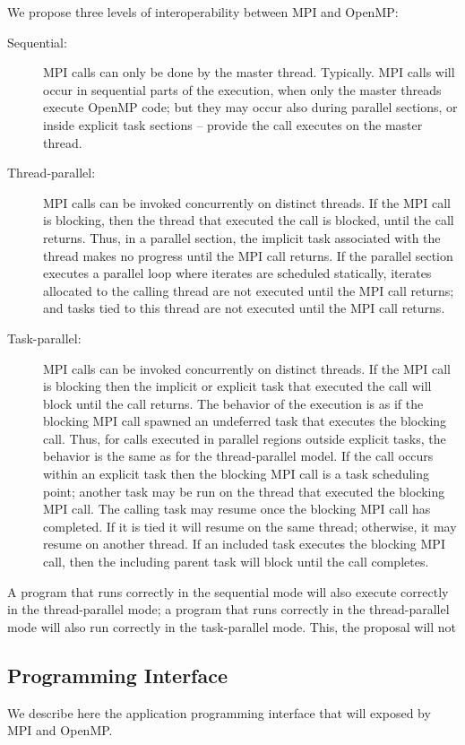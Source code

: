 \documentclass[twoside,11pt]{article}
\begin{document}
	We propose three levels of interoperability between MPI and OpenMP:
	\begin{description}
		\item[Sequential:] 
		MPI calls can only be done by the master thread. Typically. MPI calls 
		will occur in sequential parts of the execution, when only the master 
		threads execute OpenMP code; but they may occur also during parallel 
		sections, or inside explicit task sections -- provide the call executes 
		on the master thread.
		\item[Thread-parallel:]
		MPI calls can be invoked concurrently on distinct threads. If the MPI 
		call is blocking, then the thread that executed the call is blocked, 
		until the call returns. Thus, in a parallel section, the implicit task 
		associated with the thread makes no progress until the MPI call 
		returns. If the parallel section executes a parallel loop where 
		iterates are scheduled statically, iterates allocated to the calling 
		thread are not executed until the MPI call returns; and tasks tied to 
		this thread are not executed until the MPI call returns.
		\item[Task-parallel:]
		MPI calls can be invoked concurrently on distinct threads. If the MPI 
		call is blocking then the implicit or explicit task that executed the 
		call will block until the call returns. The behavior of the execution 
		is as if the blocking 
		MPI call spawned an undeferred task that executes the blocking call. 
		Thus, for calls executed in 
		parallel regions outside explicit tasks, the behavior is the same as 
		for the thread-parallel model. If the call occurs within an explicit 
		task then the blocking MPI call is a task scheduling point; another 
		task may be run on the thread that executed the blocking MPI call. The 
		calling task may resume once the blocking MPI call has completed. If it 
		is tied it will resume on the same thread; otherwise, it may resume on 
		another thread. If an included task executes the blocking MPI call, 
		then the including 
		parent task will block until the call completes.
	\end{description}

A program that runs correctly in the sequential mode will also execute 
correctly in the thread-parallel mode; a program that runs correctly in the 
thread-parallel mode will also run correctly in the task-parallel mode. This, 
the proposal will not 
\subsection{Programming Interface}
We describe here the application programming interface that will exposed by MPI 
and OpenMP.
\end{document}
